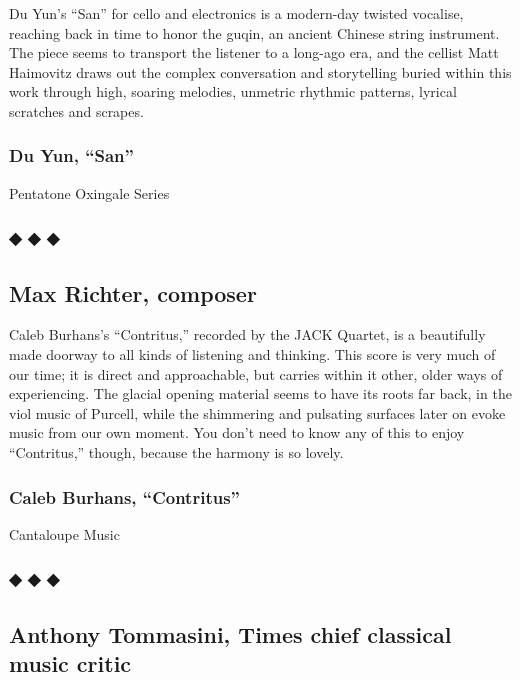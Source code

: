 Du Yun's ``San'' for cello and electronics is a modern-day twisted
vocalise, reaching back in time to honor the guqin, an ancient Chinese
string instrument. The piece seems to transport the listener to a
long-ago era, and the cellist Matt Haimovitz draws out the complex
conversation and storytelling buried within this work through high,
soaring melodies, unmetric rhythmic patterns, lyrical scratches and
scrapes.

\hypertarget{du-yun-san}{%
\subsubsection{Du Yun, ``San''}\label{du-yun-san}}

Pentatone Oxingale Series

\hypertarget{---12}{%
\subsubsection{◆ ◆ ◆}\label{---12}}

\hypertarget{max-richter-composer}{%
\subsection{Max Richter, composer}\label{max-richter-composer}}

Caleb Burhans's ``Contritus,'' recorded by the JACK Quartet, is a
beautifully made doorway to all kinds of listening and thinking. This
score is very much of our time; it is direct and approachable, but
carries within it other, older ways of experiencing. The glacial opening
material seems to have its roots far back, in the viol music of Purcell,
while the shimmering and pulsating surfaces later on evoke music from
our own moment. You don't need to know any of this to enjoy
``Contritus,'' though, because the harmony is so lovely.

\hypertarget{caleb-burhans-contritus}{%
\subsubsection{Caleb Burhans,
``Contritus''}\label{caleb-burhans-contritus}}

Cantaloupe Music

\hypertarget{---13}{%
\subsubsection{◆ ◆ ◆}\label{---13}}

\hypertarget{anthony-tommasini-times-chief-classical-music-critic}{%
\subsection{Anthony Tommasini, Times chief classical music
critic}\label{anthony-tommasini-times-chief-classical-music-critic}}

